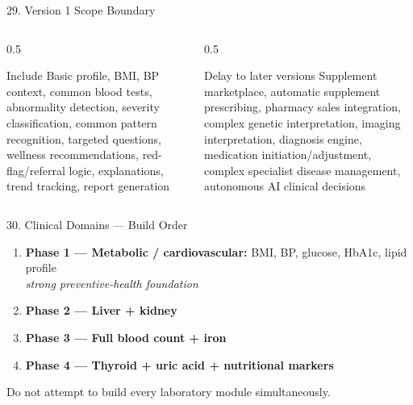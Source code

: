 \documentclass[10pt,aspectratio=169]{beamer}
\begin{document}
\begin{frame}{29. Version 1 Scope Boundary}
\scriptsize
\begin{columns}[T]
\begin{column}{0.5\textwidth}
\begin{exampleblock}{Include}
Basic profile, BMI, BP context, common blood tests, abnormality detection, severity classification, common pattern recognition, targeted questions, wellness recommendations, red-flag/referral logic, explanations, trend tracking, report generation
\end{exampleblock}
\end{column}
\begin{column}{0.5\textwidth}
\begin{alertblock}{Delay to later versions}
Supplement marketplace, automatic supplement prescribing, pharmacy sales integration, complex genetic interpretation, imaging interpretation, diagnosis engine, medication initiation/adjustment, complex specialist disease management, autonomous AI clinical decisions
\end{alertblock}
\end{column}
\end{columns}
\end{frame}

\begin{frame}{30. Clinical Domains --- Build Order}
\begin{enumerate}
\item \textbf{Phase 1 --- Metabolic / cardiovascular:} BMI, BP, glucose, HbA1c, lipid profile \\
\footnotesize \textit{strong preventive-health foundation} \normalsize
\item \textbf{Phase 2 --- Liver + kidney}
\item \textbf{Phase 3 --- Full blood count + iron}
\item \textbf{Phase 4 --- Thyroid + uric acid + nutritional markers}
\end{enumerate}
\vfill
Do not attempt to build every laboratory module simultaneously.
\end{frame}
\end{document}
